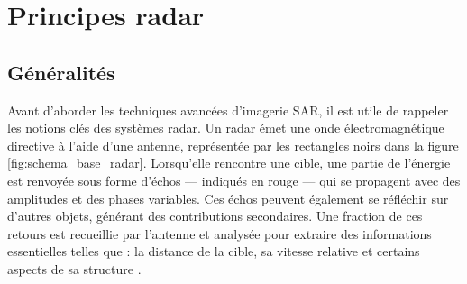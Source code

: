 \section{Principes radar}
\subsection{Généralités}

Avant d’aborder les techniques avancées d’imagerie SAR, il est utile de rappeler les notions clés des systèmes radar. Un radar émet une onde électromagnétique directive à l’aide d’une antenne, représentée par les rectangles noirs dans la figure \ref{fig:schema_base_radar}. Lorsqu’elle rencontre une cible, une partie de l’énergie est renvoyée sous forme d’échos — indiqués en rouge — qui se propagent avec des amplitudes et des phases variables. Ces échos peuvent également se réfléchir sur d’autres objets, générant des contributions secondaires. Une fraction de ces retours est recueillie par l’antenne et analysée pour extraire des informations essentielles telles que : la distance de la cible, sa vitesse relative et certains aspects de sa structure \cite{skolnik2001}.


